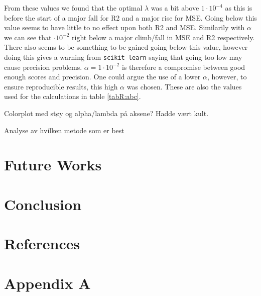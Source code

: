 \documentclass[12pt]{article}
\newcommand{\E}[1]{\cdot 10^{#1}}
\newcommand{\husk}[1]{\color{red} #1 \color{black}}
\begin{document}
From these values we found that the optimal $\lambda$ was a bit above $1\E{-4}$ as this is before the start of a major fall for R2 and a major rise for MSE. Going below this value seems to have little to no effect upon both R2 and MSE. Similarily with $\alpha$ we can see that $\E{-2}$ right below a major climb/fall in MSE and R2 respectively. There also seems to be something to be gained going below this value, however doing this gives a warning from \texttt{scikit learn} saying that going too low may cause precision problems. $\alpha = 1\E{-2}$ is therefore a compromise between good enough scores and precision. One could argue the use of a lower $\alpha$, however, to ensure reproducible results, this high $\alpha$ was chosen. These are also the values used for the calculations in table \ref{tabR:abc}.

\husk{Colorplot med støy og alpha/lambda på aksene? Hadde vært kult.}

\husk{Analyse av hvilken metode som er best}


\section{Future Works}\label{s:fw}
\section{Conclusion}  \label{s:con}
\section*{References} \label{s:ref}
\section*{Appendix A} \label{app:A}
\end{document}
